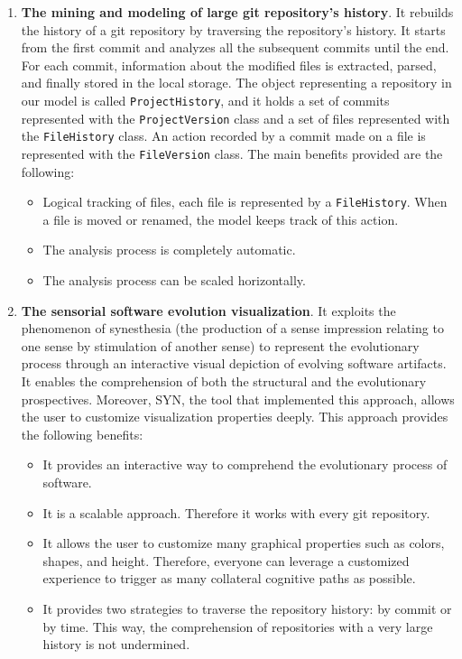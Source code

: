 \begin{enumerate}
    \item \textbf{The mining and modeling of large git repository's history}. It rebuilds the history of a git repository by traversing the repository's history. It starts from the first commit and analyzes all the subsequent commits until the end. For each commit, information about the modified files is extracted, parsed, and finally stored in the local storage. The object representing a repository in our model is called \texttt{ProjectHistory}, and it holds a set of commits represented with the \texttt{ProjectVersion} class and a set of files represented with the \texttt{FileHistory} class. An action recorded by a commit made on a file is represented with the \texttt{FileVersion} class. The main benefits provided are the following: \begin{itemize}
        \item Logical tracking of files, each file is represented by a \texttt{FileHistory}. When a file is moved or renamed, the model keeps track of this action. 
        \item The analysis process is completely automatic. 
        \item The analysis process can be scaled horizontally. 
    \end{itemize}
    \item \textbf{The sensorial software evolution visualization}. It exploits the phenomenon of synesthesia (the production of a sense impression relating to one sense by stimulation of another sense) to represent the evolutionary process through an interactive visual depiction of evolving software artifacts. It enables the comprehension of both the structural and the evolutionary prospectives. Moreover, SYN, the tool that implemented this approach, allows the user to customize visualization properties deeply. This approach provides the following benefits:
    \begin{itemize}
        \item It provides an interactive way to comprehend the evolutionary process of software.
        \item It is a scalable approach. Therefore it works with every git repository. 
        \item It allows the user to customize many graphical properties such as colors, shapes, and height. Therefore, everyone can leverage a customized experience to trigger as many collateral cognitive paths as possible. 
        \item It provides two strategies to traverse the repository history: by commit or by time. This way, the comprehension of repositories with a very large history is not undermined. 

\end{itemize}
\end{enumerate}

